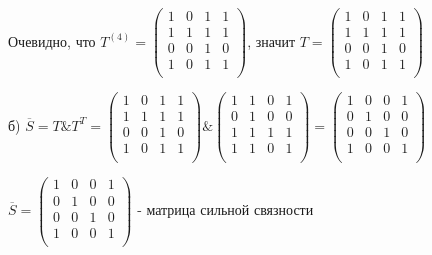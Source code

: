 \documentclass{article}
\begin{document}
\vspace{5mm}
\newpage
\hspace{8mm} Очевидно, что $T^{(4)} = 
\begin{pmatrix}
	1 & 0 & 1 & 1\\
	1 & 1 & 1 & 1\\
	0 & 0 & 1 & 0\\
	1 & 0 & 1 & 1\\
\end{pmatrix}$, значит $T = 
\begin{pmatrix}
    1 & 0 & 1 & 1\\
	1 & 1 & 1 & 1\\
	0 & 0 & 1 & 0\\
	1 & 0 & 1 & 1\\
\end{pmatrix}$
\vspace{5mm}
\par
б) $\overline{S} = T \& T^T = \begin{pmatrix}
	1 & 0 & 1 & 1\\
	1 & 1 & 1 & 1\\
	0 & 0 & 1 & 0\\
	1 & 0 & 1 & 1\\
\end{pmatrix} \& 
\begin{pmatrix}
	1 & 1 & 0 & 1\\
	0 & 1 & 0 & 0\\
	1 & 1 & 1 & 1\\
	1 & 1 & 0 & 1\\
\end{pmatrix} = 
\begin{pmatrix}
	1 & 0 & 0 & 1\\
	0 & 1 & 0 & 0\\
	0 & 0 & 1 & 0\\
	1 & 0 & 0 & 1\\
\end{pmatrix}$
\vspace{5mm}
\par
\hspace{5mm}$\overline{S} = \begin{pmatrix}
	1 & 0 & 0 & 1\\
	0 & 1 & 0 & 0\\
	0 & 0 & 1 & 0\\
	1 & 0 & 0 & 1\\
\end{pmatrix}$ - матрица сильной связности
\vspace{5mm}
\par
\end{document}
